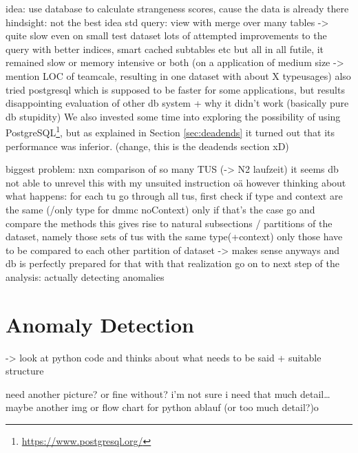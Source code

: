 
idea: use database to calculate strangeness scores, cause the data is already there
hindsight: not the best idea
std query: view with merge over many tables -> quite slow even on small test dataset
lots of attempted improvements to the query with better indices, smart cached subtables etc
but all in all futile, it remained slow or memory intensive or both (on a application of medium size -> mention LOC of teamcale, resulting in one dataset with about X typeusages)
also tried postgresql which is supposed to be faster for some applications, but results disappointing
evaluation of other db system + why it didn't work (basically pure db stupidity)
We also invested some time into exploring the possibility of using PostgreSQL\footnote{\url{https://www.postgresql.org/}}, but as explained in Section \ref{sec:deadends} it turned out that its performance was inferior. (change, this is the deadends section xD)

biggest problem: nxn comparison of so many TUS (-> N2 laufzeit)
it seems db not able to unrevel this with my unsuited instruction oä
however thinking about what happens:
for each tu go through all tus, first check if type and context are the same (/only type for dmmc noContext)
only if that's the case go and compare the methods
this gives rise to natural subsections / partitions of the dataset, namely those sets of tus with the same type(+context)
only those have to be compared to each other
partition of dataset -> makes sense anyways and db is perfectly prepared for that
with that realization go on to next step of the analysis: actually detecting anomalies

\section{Anomaly Detection}\label{sec:anomaly}

-> look at python code and thinks about what needs to be said + suitable structure

need another picture? or fine without? i'm not sure i need that much detail\ldots
maybe another img or flow chart for python ablauf (or too much detail?)o


